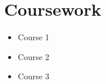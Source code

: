 \documentclass{article}
\begin{document}
\vspace{-0.65cm}
\section{Coursework}
\begin{itemize}
    \item Course 1
    \item Course 2
    \item Course 3
\end{itemize}
\end{document}
